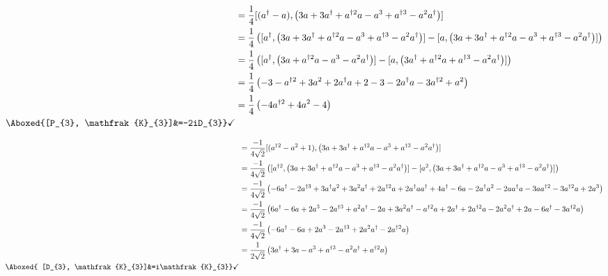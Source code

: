 \documentclass[]{article}
\numberwithin{equation}{section}
\begin{document}
{{\begin{align}
    [P_{3}, \mathfrak{K}_{3}]&=\frac{1}{4}[(a^{\dagger}-a), \left(3a+3a^{\dagger}+  a^{\dagger 2}a - a^3 +  a^{\dagger 3} - a^2 a^{\dagger}\right)]\\
    &=\frac{1}{4}\left([a^{\dagger}, \left(3a+3a^{\dagger}+  a^{\dagger 2}a - a^3 +  a^{\dagger 3} - a^2 a^{\dagger}\right)]-[a, \left(3a+3a^{\dagger}+  a^{\dagger 2}a - a^3 +  a^{\dagger 3} - a^2 a^{\dagger}\right)]\right)\\
    &=\frac{1}{4}\left([a^{\dagger}, \left(3a+  a^{\dagger 2}a - a^3 - a^2 a^{\dagger}\right)]-[a, \left(3a^{\dagger}+  a^{\dagger 2}a  +  a^{\dagger 3} - a^2 a^{\dagger}\right)]\right)\\
    &=\frac{1}{4}\left(-3-a^{\dagger 2}+3a^2+2a^{\dagger} a+2 -3-2a^\dagger a-3a^{\dagger 2}+a^2\right)\\
    &=\frac{1}{4}\left(-4a^{\dagger 2}+4a^2-4\right)\\
    \Aboxed{[P_{3}, \mathfrak{K}_{3}]&=-2iD_{3}}\checkmark
\end{align}

\begin{align}
    [D_{3}, \mathfrak{K}_{3}]&=\frac{-1}{4\sqrt{2}}[(a^{\dagger 2}-a^2+1), \left(3a+3a^{\dagger}+  a^{\dagger 2}a - a^3 +  a^{\dagger 3} - a^2 a^{\dagger}\right)]\\
    &=\frac{-1}{4\sqrt{2}}\left([a^{\dagger 2}, \left(3a+3a^{\dagger}+  a^{\dagger 2}a - a^3 +  a^{\dagger 3} - a^2 a^{\dagger}\right)]-[a^{2}, \left(3a+3a^{\dagger}+  a^{\dagger 2}a - a^3 +  a^{\dagger 3} - a^2 a^{\dagger}\right)]\right)\\
    &=\frac{-1}{4\sqrt{2}}\left(-6a^{\dagger}-2a^{\dagger 3}+3a^{\dagger}a^2+3a^2a^{\dagger}+2a^{\dagger2} a+2a^{\dagger} aa^{\dagger}+4a^{\dagger} -6a-2a^\dagger a^{2}-2aa^\dagger a-3aa^{\dagger 2}-3a^{\dagger 2}a+2a^3\right)\\
    &=\frac{-1}{4\sqrt{2}}\left(6a^{\dagger}-6a+2a^3-2a^{\dagger 3}+a^2a^{\dagger}-2a+3a^2a^{\dagger}-a^{\dagger2} a+2a^{\dagger} +2a^{\dagger2}a -2a^{2}a^\dagger +2a-6a^{\dagger }-3a^{\dagger 2} a\right)\\
    &=\frac{-1}{4\sqrt{2}}\left(-6a^{\dagger}-6a+2a^3-2a^{\dagger 3}+2a^2a^{\dagger}-2a^{\dagger2} a \right)\\
    &=\frac{1}{2\sqrt{2}}\left(3a^{\dagger}+3a-a^3+a^{\dagger 3}-a^2a^{\dagger}+a^{\dagger2} a \right)\\
   \Aboxed{ [D_{3}, \mathfrak{K}_{3}]&=i\mathfrak{K}_{3}} \checkmark
\end{align}

}}
\end{document}
